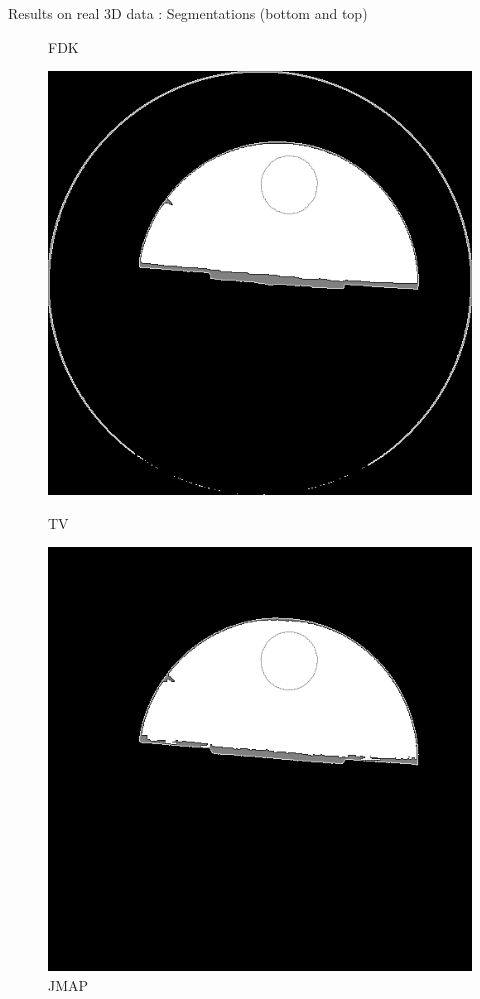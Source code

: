 \documentclass[latex]{beamer}
\begin{document}
\begin{frame}{}
\begin{block}{Results on real 3D data : Segmentations (bottom and top)}
\begin{figure}
\begin{minipage}[htb]{0.30\linewidth}
\caption*{FDK}
\end{minipage} \hfill
\begin{minipage}[htb]{0.30\linewidth}
\centering
\includegraphics[scale=0.19]{segmentationIQI_TVGamma3K4Proj300Haut.png}
\caption*{TV}
\end{minipage} \hfill
\begin{minipage}[htb]{0.30\linewidth}
\centering
\includegraphics[scale=0.19]{segmentationIQI_JMAPPottsIndGamma3K4Proj300Haut.png}
\caption*{JMAP}
\end{minipage}
\end{figure}
\end{block}
\end{frame}
\end{document}
